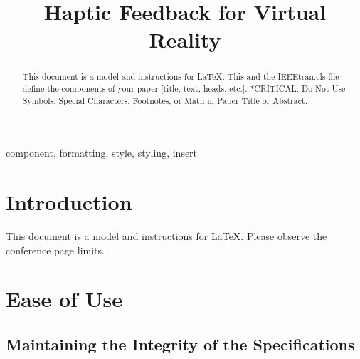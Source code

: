 \documentclass[conference]{IEEEtran}
\begin{document}
\title{Haptic Feedback for Virtual Reality}

\author{
    \and
}

\maketitle

\begin{abstract}
    This document is a model and instructions for \LaTeX.
    This and the IEEEtran.cls file define the components of your paper [title, text, heads, etc.]. *CRITICAL: Do Not Use Symbols, Special Characters, Footnotes, 
    or Math in Paper Title or Abstract.
\end{abstract}

\begin{IEEEkeywords}
    component, formatting, style, styling, insert
\end{IEEEkeywords}

\section{Introduction}
This document is a model and instructions for \LaTeX.
Please observe the conference page limits. 

\section{Ease of Use}

\subsection{Maintaining the Integrity of the Specifications}
\end{document}
